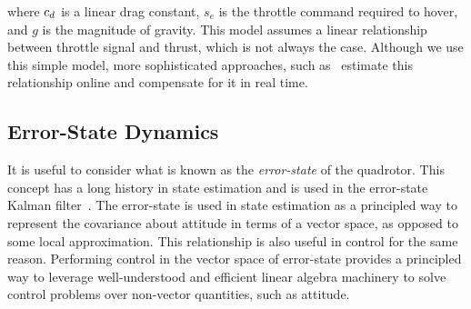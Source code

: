 \normalsize
where $c_d$ is a linear drag constant, $s_e$ is the throttle command required to hover, and $g$ is the magnitude of gravity.  This model assumes a linear relationship between throttle signal and thrust, which is not always the case.  Although we use this simple model, more sophisticated approaches, such as~\cite{small2018mpc} estimate this relationship online and compensate for it in real time.


\subsection{Error-State Dynamics} \label{subsec:error_state_dyn}

It is useful to consider what is known as the \emph{error-state} of the
quadrotor.  This concept has a long history in state estimation and is used in
the error-state Kalman
filter~\cite{sola2017quaternion,Markley2004MultiplicativeVA}.  The error-state
is used in state estimation as a principled way to represent the covariance
about attitude in terms of a vector space, as opposed to some local
approximation.  This relationship is also useful in control for the same reason.
Performing control in the vector space of error-state provides a principled way
to leverage well-understood and efficient linear algebra machinery to solve
control problems over non-vector quantities, such as attitude.  


